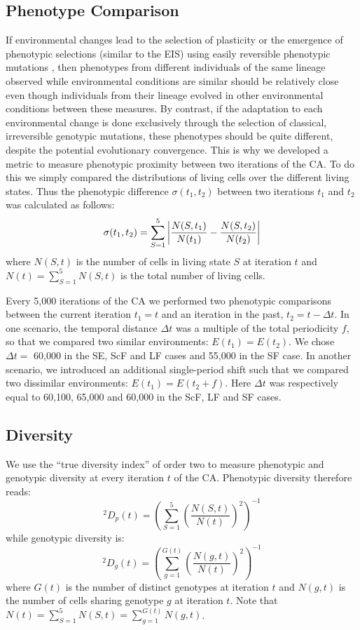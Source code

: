 \subsection{Phenotype Comparison}
If environmental changes lead to the selection of plasticity or the emergence of phenotypic selections (similar to the EIS) using easily reversible phenotypic mutations \citep{jablonka2014evolution}, then phenotypes from different individuals of the same lineage observed while environmental conditions are similar should be relatively close even though individuals from their lineage evolved in other environmental conditions between these measures. By contrast, if the adaptation to each environmental change is done exclusively through the selection of classical, irreversible genotypic mutations, these phenotypes should be quite different, despite the potential evolutionary convergence. This is why we developed a metric to measure phenotypic proximity between two iterations of the CA. To do this we simply compared the distributions of living cells over the different living states. Thus the phenotypic difference $\sigma(t_1,t_2)$ between two iterations $t_1$ and $t_2$ was calculated as follows:
%
$$\sigma(t_1,t_2) = \sum_{S=1}^5 \left| \frac{N(S,t_1)}{N(t_1)}-\frac{N(S,t_2)}{N(t_2)}\right|$$ 
%
where $N(S,t)$ is the number of cells in living state $S$ at iteration $t$ and $N(t)=\sum_{S=1}^5 N(S,t)$ is the total number of living cells.

Every 5,000 iterations of the CA we performed two phenotypic comparisons between the current iteration $t_1 = t$ and an iteration in the past, $t_2 = t - \Delta t$. In one scenario, the temporal distance $\Delta t$ was a multiple of the total periodicity $f$, so that we compared two similar environments: $E(t_1) = E(t_2)$. We chose $\Delta t =$ 60,000 in the SE, ScF and LF cases and 55,000 in the SF case. In another scenario, we introduced an additional single-period shift such that we compared two dissimilar environments: $E(t_1) = E(t_2 + f)$. Here $\Delta t$ was respectively equal to 60,100, 65,000 and 60,000 in the ScF, LF and SF cases.

\subsection{Diversity}
We use the ``true diversity index'' of order two \citep{jost2006entropy} to measure phenotypic and genotypic diversity at every iteration $t$ of the CA. Phenotypic diversity therefore reads:
%
$$^2\!D_p(t)=\left(\sum_{S=1}^5 \left(\frac{N(S,t)}{N(t)}\right)^2\right)^{-1}$$
%
while genotypic diversity is:
%
$$^2\!D_g(t)=\left(\sum_{g=1}^{G(t)} \left(\frac{N(g,t)}{N(t)}\right)^2\right)^{-1}$$
%
where $G(t)$ is the number of distinct genotypes at iteration $t$ and $N(g,t)$ is the number of cells sharing genotype $g$ at iteration $t$. Note that $N(t)=\sum_{S=1}^5 N(S,t)=\sum_{g=1}^{G(t)} N(g,t)$.


